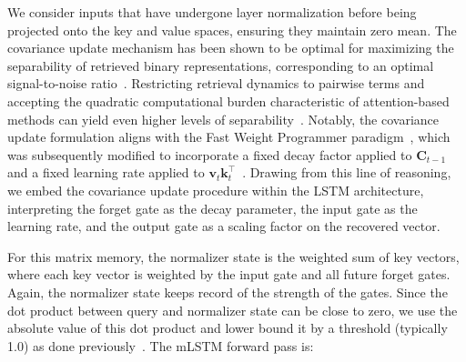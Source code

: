 We consider inputs that have undergone layer normalization before being projected onto the key and value spaces, ensuring they maintain zero mean. The covariance update mechanism has been shown to be optimal for maximizing the separability of retrieved binary representations, corresponding to an optimal signal-to-noise ratio~\citep{Dayan:91}. Restricting retrieval dynamics to pairwise terms and accepting the quadratic computational burden characteristic of attention-based methods can yield even higher levels of separability~\citep{Krotov:16,Krotov:17,Ramsauer:21}. Notably, the covariance update formulation aligns with the Fast Weight Programmer paradigm~\citep{Schmidhuber:92ncfastweights,Schlag:21}, which was subsequently modified to incorporate a fixed decay factor applied to $\mathbf{C}_{t-1}$ and a fixed learning rate applied to 
$\mathbf{v}_{t} \mathbf{k}_t^\top$~\citep{Ba:16}.
Drawing from this line of reasoning, we embed the covariance update procedure within the LSTM architecture, interpreting the forget gate as the decay parameter, the input gate as the learning rate, and the output gate as a scaling factor on the recovered vector.

For this matrix memory, the normalizer state is the weighted sum of key vectors, where each key vector is weighted by the input gate and all future forget gates. Again, the normalizer state keeps record of the strength of the gates. Since the dot product between query and normalizer state can be close to zero, we use the absolute value of this dot product and lower bound it by a threshold (typically 1.0) as done previously~\citep{Sun:23arxiv}. The mLSTM forward pass is:

